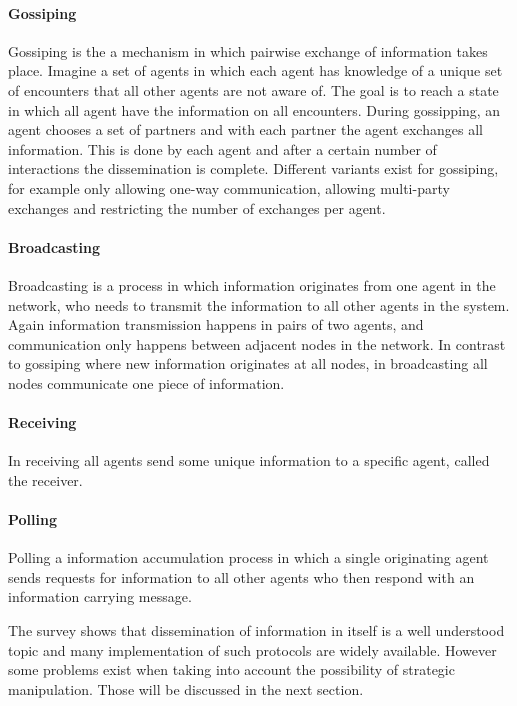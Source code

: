 \paragraph{Gossiping} Gossiping is the a mechanism in which pairwise exchange of information takes 
place. Imagine a set of agents in which each agent has knowledge of a unique set of encounters that
all other agents are not aware of. The goal is to reach a state in which all agent have the
information on all encounters. During gossipping, an agent chooses a set of partners and with each 
partner the agent exchanges all information. This is done by each agent and after a certain number
of interactions the dissemination is complete. Different variants exist for gossiping, for example
only allowing one-way communication, allowing multi-party exchanges and restricting the number of 
exchanges per agent. 

\paragraph{Broadcasting} Broadcasting is a process in which information originates from one 
agent in the network, who needs to transmit the information to all other agents in the system. Again
information transmission happens in pairs of two agents, and communication only happens between 
adjacent nodes in the network. In contrast to gossiping where new information originates at all 
nodes, in broadcasting all nodes communicate one piece of information.

\paragraph{Receiving} In receiving all agents send some unique information to a specific agent, called
the receiver. 

\paragraph{Polling} Polling a information accumulation process in which a single originating agent sends requests for
information to all other agents who then respond with an information carrying message. 

The survey shows that dissemination of information in itself is a well understood topic and many 
implementation of such protocols are widely available. However some problems exist when taking into
account the possibility of strategic manipulation. Those will be discussed in the next section.


